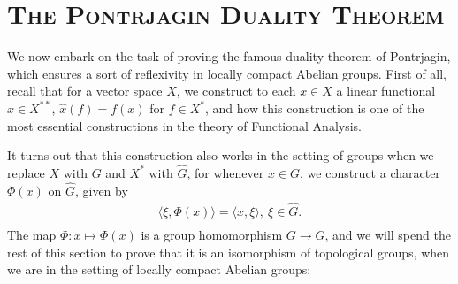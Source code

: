 \documentclass[10pt,twoside,openany,final]{memoir}
\newcommand{\sssection}[1]{%
\section[#1]{\centering\normalfont\scshape \textbf{#1}}}
\theoremstyle{definition}
\theoremstyle{Break}
\newcommand{\G}{\widehat{G}}
\begin{document}
\sssection{The Pontrjagin Duality Theorem}
We now embark on the task of proving the famous duality theorem of Pontrjagin, which ensures a sort of reflexivity in locally compact Abelian groups. First of all, recall that for a vector space $X$, we construct to each $x \in X$ a linear functional $\widehat{x} \in X^{**}$, $\widehat{x}(f)=f(x)$ for $f \in X^*$, and how this construction is one of the most essential constructions in the theory of Functional Analysis.

It turns out that this construction also works in the setting of groups when we replace $X$ with $G$ and $X^*$ with $\G$, for whenever $x \in G$, we construct a character $\Phi(x)$ on $\G$, given by
\begin{align*}
	\langle \xi, \Phi(x)\rangle=\langle x, \xi\rangle, \ \xi \in \G.
\end{align*}
The map $\Phi \colon x \mapsto \Phi(x)$ is a group homomorphism $G \to \widehat \G$, and we will spend the rest of this section to prove that it is an isomorphism of topological groups, when we are in the setting of locally compact Abelian groups:
\end{document}
